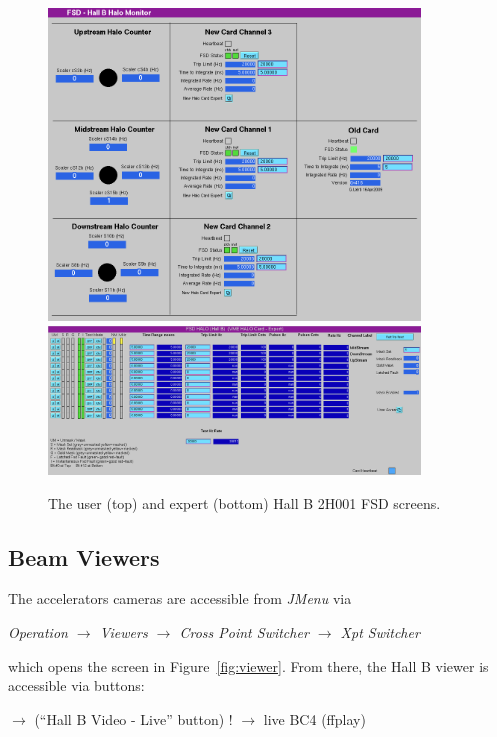 \documentclass[amsmath,amssymb,notitlepage,11pt]{revtex4}
\begin{document}
\begin{figure}[htbp]\centering
  \includegraphics[width=0.88\textwidth]{pics/fsdexpert}\vspace{2mm}
    \includegraphics[width=0.88\textwidth]{pics/fsduser}
  \caption{The user (top) and expert (bottom) Hall B 2H001 FSD screens.\label{fig:fsd}}
\end{figure}
\subsection{Beam Viewers} The accelerators cameras are accessible from {\em JMenu} via  
\begin{center}{\em Operation $\to$ Viewers $\to$ Cross Point Switcher $\to$ Xpt Switcher}\end{center}
which opens the screen in Figure~\ref{fig:viewer}.  From there, the Hall B viewer is accessible via buttons:
\begin{center}$\to$ (``Hall B Video - Live'' button) ! $\to$ live BC4 (ffplay)\end{center}
\end{document}
